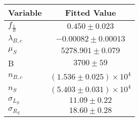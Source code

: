 \begin{tabular}[t]{lc}
\hline
Variable &Fitted Value\\
\hline\hline
$f_{\frac{L}{R}}$&$0.450\pm0.023$\\
\hline
$\lambda_{B,c}$&$-0.00082\pm0.00013$\\
\hline
$\mu_S$&$5278.901\pm0.079$\\
\hline
B&$3700\pm59$\\
\hline
$n_{B,c}$&$(1.536\pm0.025)\times 10^4$\\
\hline
$n_S$&$(5.403\pm0.031)\times 10^4$\\
\hline
$\sigma_{L_S}$&$11.09\pm0.22$\\
\hline
$\sigma_{R_S}$&$18.60\pm0.28$\\
\hline
\end{tabular}